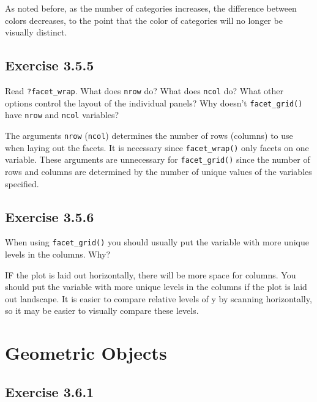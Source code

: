 \documentclass[]{book}
\theoremstyle{plain}
\theoremstyle{remark}
\begin{document}
As noted before, as the number of categories increases, the difference
between colors decreases, to the point that the color of categories will
no longer be visually distinct.

\hypertarget{exercise-3.5.5}{%
\subsection*{\texorpdfstring{Exercise
{3.5.5}}{Exercise 3.5.5}}\label{exercise-3.5.5}}

Read \texttt{?facet\_wrap}. What does \texttt{nrow} do? What does
\texttt{ncol} do? What other options control the layout of the
individual panels? Why doesn't \texttt{facet\_grid()} have \texttt{nrow}
and \texttt{ncol} variables?

The arguments \texttt{nrow} (\texttt{ncol}) determines the number of
rows (columns) to use when laying out the facets. It is necessary since
\texttt{facet\_wrap()} only facets on one variable. These arguments are
unnecessary for \texttt{facet\_grid()} since the number of rows and
columns are determined by the number of unique values of the variables
specified.

\hypertarget{exercise-3.5.6}{%
\subsection*{\texorpdfstring{Exercise
{3.5.6}}{Exercise 3.5.6}}\label{exercise-3.5.6}}

When using \texttt{facet\_grid()} you should usually put the variable
with more unique levels in the columns. Why?

IF the plot is laid out horizontally, there will be more space for
columns. You should put the variable with more unique levels in the
columns if the plot is laid out landscape. It is easier to compare
relative levels of y by scanning horizontally, so it may be easier to
visually compare these levels.

\hypertarget{geometric-objects}{%
\section{Geometric Objects}\label{geometric-objects}}

\hypertarget{exercise-3.6.1}{%
\subsection*{\texorpdfstring{Exercise
{3.6.1}}{Exercise 3.6.1}}\label{exercise-3.6.1}}
\end{document}
